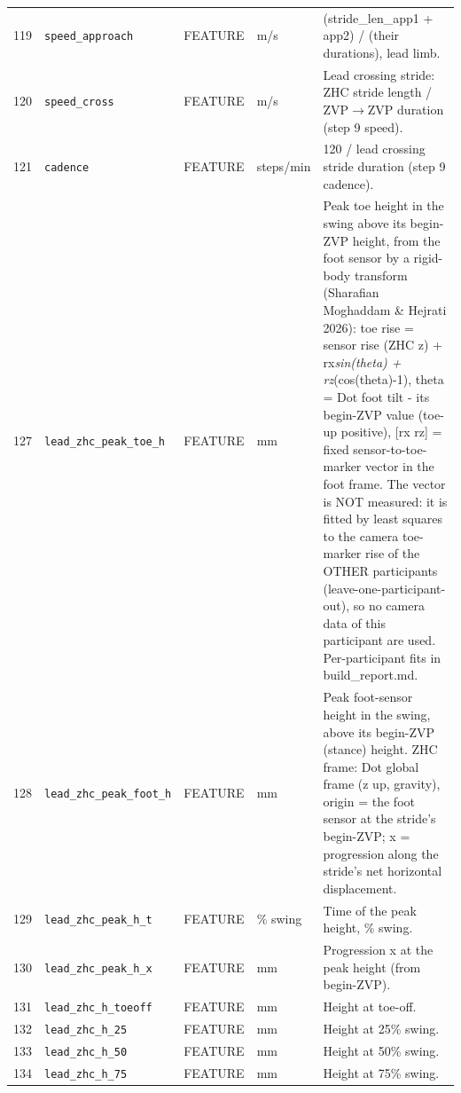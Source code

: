 \begin{longtable}{@{}r p{3.6cm} p{1.55cm} p{1.15cm} p{8.6cm}@{}}
119 & \texttt{speed\_\allowbreak{}approach} & FEATURE & m/s & (stride\_len\_app1 + app2) / (their durations), lead limb. \\
120 & \texttt{speed\_\allowbreak{}cross} & FEATURE & m/s & Lead crossing stride: ZHC stride length / ZVP$\rightarrow$ZVP duration (step 9 speed). \\
121 & \texttt{cadence} & FEATURE & steps/min & 120 / lead crossing stride duration (step 9 cadence). \\
127 & \texttt{lead\_\allowbreak{}zhc\_\allowbreak{}peak\_\allowbreak{}toe\_\allowbreak{}h} & FEATURE & mm & Peak toe height in the swing above its begin-ZVP height, from the foot sensor by a rigid-body transform (Sharafian Moghaddam \& Hejrati 2026): toe rise = sensor rise (ZHC z) + rx\emph{sin(theta) + rz}(cos(theta)-1), theta = Dot foot tilt - its begin-ZVP value (toe-up positive), [rx rz] = fixed sensor-to-toe-marker vector in the foot frame. The vector is NOT measured: it is fitted by least squares to the camera toe-marker rise of the OTHER participants (leave-one-participant-out), so no camera data of this participant are used. Per-participant fits in build\_report.md. \\
128 & \texttt{lead\_\allowbreak{}zhc\_\allowbreak{}peak\_\allowbreak{}foot\_\allowbreak{}h} & FEATURE & mm & Peak foot-sensor height in the swing, above its begin-ZVP (stance) height. ZHC frame: Dot global frame (z up, gravity), origin = the foot sensor at the stride's begin-ZVP; x = progression along the stride's net horizontal displacement. \\
129 & \texttt{lead\_\allowbreak{}zhc\_\allowbreak{}peak\_\allowbreak{}h\_\allowbreak{}t} & FEATURE & \% swing & Time of the peak height, \% swing. \\
130 & \texttt{lead\_\allowbreak{}zhc\_\allowbreak{}peak\_\allowbreak{}h\_\allowbreak{}x} & FEATURE & mm & Progression x at the peak height (from begin-ZVP). \\
131 & \texttt{lead\_\allowbreak{}zhc\_\allowbreak{}h\_\allowbreak{}toeoff} & FEATURE & mm & Height at toe-off. \\
132 & \texttt{lead\_\allowbreak{}zhc\_\allowbreak{}h\_\allowbreak{}25} & FEATURE & mm & Height at 25\% swing. \\
133 & \texttt{lead\_\allowbreak{}zhc\_\allowbreak{}h\_\allowbreak{}50} & FEATURE & mm & Height at 50\% swing. \\
134 & \texttt{lead\_\allowbreak{}zhc\_\allowbreak{}h\_\allowbreak{}75} & FEATURE & mm & Height at 75\% swing. \\

\end{longtable}
